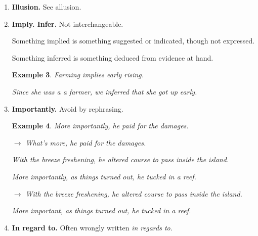 \documentclass{book}
\numberwithin{equation}{section}
\newtheorem{example}{Example}[chapter]
\begin{document}
\begin{enumerate}
    The word usually serves better when not in 1st position.
    \begin{example}
        The roads were almost impassable.
        
        However, we at least succeeded in reaching camp.
        
        $\to$ The roads were almost impassable.
        
        At last, however, we succeeded in reaching camp.
    \end{example}
    When \textit{however} comes 1st, it means ``in whatever way'' or ``to whatever extent.''
    \begin{example}
        However you advise him, he will probably do as he thinks best.
        
        However discouraging the prospect, they never lost heart.
    \end{example}
    \item \textbf{Illusion.} See allusion.
    \item \textbf{Imply. Infer.} Not interchangeable.
    
    Something implied is something suggested or indicated, though not expressed.
    
    Something inferred is something deduced from evidence at hand.
    \begin{example}
        Farming implies early rising.
        
        Since she was a a farmer, we inferred that she got up early.
    \end{example}
    \item \textbf{Importantly.} Avoid by rephrasing.
    \begin{example}
        More importantly, he paid for the damages.
        
        $\to$ What's more, he paid for the damages.
        
        With the breeze freshening, he altered course to pass inside the island.
        
        More importantly, as things turned out, he tucked in a reef.
        
        $\to$ With the breeze freshening, he altered course to pass inside the island.
        
        More important, as things turned out, he tucked in a reef.
    \end{example}
    \item \textbf{In regard to.} Often wrongly written \textit{in regards to}.
    

\end{enumerate}
\end{document}
